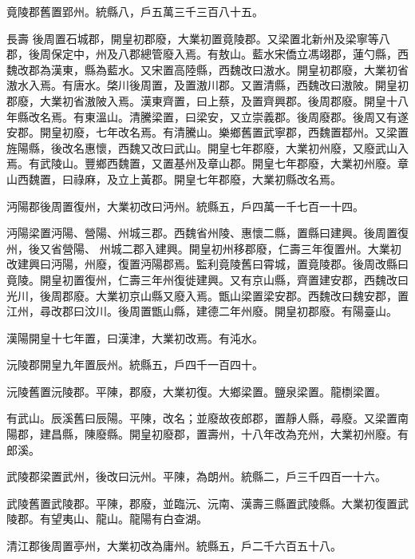 \begin{pinyinscope}
 竟陵郡舊置郢州。統縣八，戶五萬三千三百八十五。



 長壽
 後周置石城郡，開皇初郡廢，大業初置竟陵郡。又梁置北新州及梁寧等八郡，後周保定中，州及八郡總管廢入焉。有敖山。藍水宋僑立馮翊郡，蓮勺縣，西魏改郡為漢東，縣為藍水。又宋置高陸縣，西魏改曰滶水。開皇初郡廢，大業初省滶水入焉。有唐水。棨川後周置，及置滶川郡。又置清縣，西魏改曰滶陂。開皇初郡廢，大業初省滶陂入焉。漢東齊置，曰上蔡，及置齊興郡。後周郡廢。開皇十八年縣改名焉。有東溫山。清騰梁置，曰梁安，又立崇義郡。後周廢郡。後周又有遂安郡。開皇初廢，七年改名焉。有清騰山。樂鄉舊置武寧郡，西魏置鄀州。又梁置旌陽縣，後改名惠懷，西魏又改曰武山。開皇七年郡廢，大業初州廢，又廢武山入焉。有武陵山。豐鄉西魏置，又置基州及章山郡。開皇七年郡廢，大業初州廢。章山西魏置，曰祿麻，及立上黃郡。開皇七年郡廢，大業初縣改名焉。



 沔陽郡後周置復州，大業初改曰沔州。統縣五，戶四萬一千七百一十四。



 沔陽梁置沔陽、營陽、州城三郡。西魏省州陵、惠懷二縣，置縣曰建興。後周置復州，後又省營陽、
 州城二郡入建興。開皇初州移郡廢，仁壽三年復置州。大業初改建興曰沔陽，州廢，復置沔陽郡焉。監利竟陵舊曰霄城，置竟陵郡。後周改縣曰竟陵。開皇初置復州，仁壽三年州復徙建興。又有京山縣，齊置建安郡，西魏改曰光川，後周郡廢。大業初京山縣又廢入焉。甑山梁置梁安郡。西魏改曰魏安郡，置江州，尋改郡曰汶川。後周置甑山縣，建德二年州廢。開皇初郡廢。有陽臺山。



 漢陽開皇十七年置，曰漢津，大業初改焉。有沌水。



 沅陵郡開皇九年置辰州。統縣五，戶四千一百四十。



 沅陵舊置沅陵郡。平陳，郡廢，大業初復。大鄉梁置。鹽泉梁置。龍檦梁置。



 有武山。辰溪舊曰辰陽。平陳，改名；並廢故夜郎郡，置靜人縣，尋廢。又梁置南陽郡，建昌縣，陳廢縣。開皇初廢郡，置壽州，十八年改為充州，大業初州廢。有郎溪。



 武陵郡梁置武州，後改曰沅州。平陳，為朗州。統縣二，戶三千四百一十六。



 武陵舊置武陵郡。平陳，郡廢，並臨沅、沅南、漢壽三縣置武陵縣。大業初復置武陵郡。有望夷山、龍山。龍陽有白查湖。



 清江郡後周置亭州，大業初改為庸州。統縣五，戶二千六百五十八。




\end{pinyinscope}
